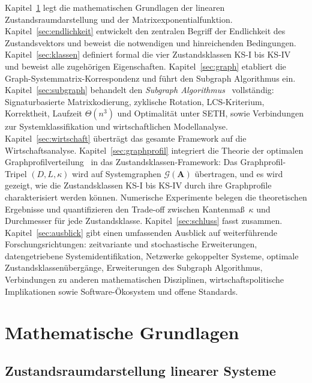 \documentclass[a4paper, 12pt, twoside, openright]{report}
\theoremstyle{definition}
\theoremstyle{definition}
\newcommand{\vA}{\bm{A}}
\begin{document}
Kapitel~\ref{sec:grundlagen} legt die mathematischen Grundlagen der linearen
Zustandsraumdarstellung und der Matrixexponentialfunktion. Kapitel~\ref{sec:endlichkeit}
entwickelt den zentralen Begriff der Endlichkeit des Zustandsvektors und beweist die
notwendigen und hinreichenden Bedingungen. Kapitel~\ref{sec:klassen} definiert formal
die vier Zustandsklassen KS-I bis KS-IV und beweist alle zugehörigen Eigenschaften.
Kapitel~\ref{sec:graph} etabliert die Graph-Systemmatrix-Korrespondenz und führt den
Subgraph Algorithmus ein. Kapitel~\ref{sec:subgraph} behandelt den
\emph{Subgraph Algorithmus}~\citep{epp2026subgraph} vollständig: Signaturbasierte
Matrixkodierung, zyklische Rotation, LCS-Kriterium, Korrektheit, Laufzeit $\Theta(n^3)$
und Optimalität unter SETH, sowie Verbindungen zur Systemklassifikation und
wirtschaftlichen Modellanalyse. Kapitel~\ref{sec:wirtschaft} überträgt das gesamte
Framework auf die Wirtschaftsanalyse.
Kapitel~\ref{sec:graphprofil} integriert die Theorie der optimalen
Graphprofilverteilung~\citep{epp2026graphs} in das Zustandsklassen-Framework:
Das Graphprofil-Tripel $(D, L, \kappa)$ wird auf Systemgraphen $\mathcal{G}(\vA)$
übertragen, und es wird gezeigt, wie die Zustandsklassen KS-I bis KS-IV durch
ihre Graphprofile charakterisiert werden können. Numerische Experimente belegen die
theoretischen Ergebnisse und quantifizieren den Trade-off zwischen Kantenmaß~$\kappa$
und Durchmesser für jede Zustandsklasse.
Kapitel~\ref{sec:schluss} fasst zusammen.
Kapitel~\ref{sec:ausblick} gibt einen umfassenden Ausblick auf weiterführende
Forschungsrichtungen: zeitvariante und stochastische Erweiterungen, datengetriebene
Systemidentifikation, Netzwerke gekoppelter Systeme, optimale Zustandsklassenübergänge,
Erweiterungen des Subgraph Algorithmus, Verbindungen zu anderen mathematischen
Disziplinen, wirtschaftspolitische Implikationen sowie Software-Ökosystem und
offene Standards.

\section{Mathematische Grundlagen}
\label{sec:grundlagen}

\subsection{Zustandsraumdarstellung linearer Systeme}
\end{document}
